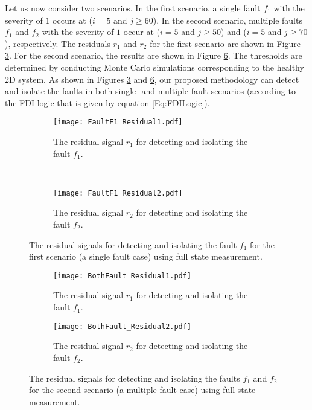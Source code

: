 \documentclass[journal,12pt,draftcls,onecolumn]{IEEEtran}
\begin{document}
Let us now consider two scenarios. In the first scenario, a single fault $f_1$ with the severity of $1$ occurs at ($i=5$ and $j\geq60$). In the second scenario, multiple faults $f_1$ and $f_2$ with the severity of $1$  occur at ($i=5$ and $j\geq50$) and ($i=5$ and $j\geq70$), respectively. The residuals $r_1$ and $r_2$ for the first scenario  are shown in Figure \ref{fig:ScenarioI}. For the second scenario, the results are shown in Figure \ref{fig:ScenarioII}. The thresholds are determined by conducting  Monte Carlo simulations \cite{MonteCarloBook} corresponding to the healthy 2D system. As shown in Figures \ref{fig:ScenarioI} and \ref{fig:ScenarioII}, our proposed methodology can detect and isolate the faults in both single- and multiple-fault scenarios (according to the FDI logic that is given by equation \eqref{Eq:FDILogic}).
\begin{figure}
	\centering
	\begin{subfigure}{0.4\textwidth}
		\texttt{[image: FaultF1\_Residual1.pdf]}
		\caption{The residual signal $r_1$ for detecting and isolating the fault $f_1$.}
		\label{fig:FaultFl_Ff}
	\end{subfigure}
	~
	\begin{subfigure}{0.4\textwidth}
\texttt{[image: FaultF1\_Residual2.pdf]}
		\caption{The residual signal $r_2$ for detecting and isolating the fault $f_2$.}
		\label{fig:FaultFl_Fl}
	\end{subfigure}
	\caption{The residual signals for detecting and isolating the fault $f_1$ for the first scenario (a single fault case) using full state measurement.}
	\label{fig:ScenarioI}
	\vspace{-2mm}
\end{figure}

\begin{figure}
	\centering
	\begin{subfigure}{0.45\textwidth}
		\texttt{[image: BothFault\_Residual1.pdf]}
		\caption{The residual signal $r_1$ for detecting and isolating the fault $f_1$.}
		\label{fig:FaultBoth_Ff}
	\end{subfigure}
	\begin{subfigure}{0.45\textwidth}
		\texttt{[image: BothFault\_Residual2.pdf]}
		\caption{The residual signal $r_2$ for detecting and isolating the fault $f_2$.}
		\label{fig:FaultBoth_Fl}
	\end{subfigure}
	\caption{The residual signals for detecting and isolating the faults $f_1$ and $f_2$ for the second scenario (a multiple fault case) using full state measurement.}
	\label{fig:ScenarioII}
	\vspace{-2mm}
\end{figure}
\end{document}
